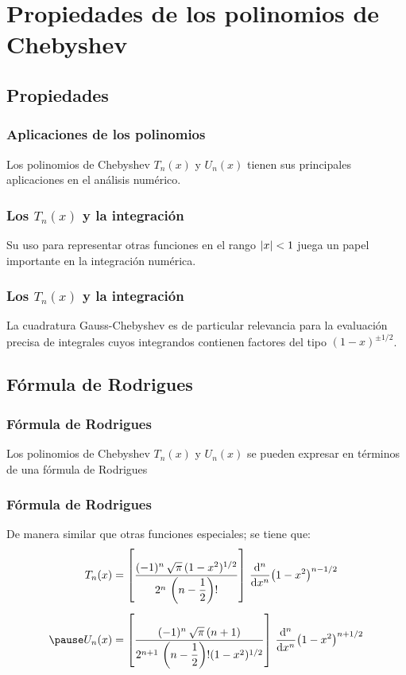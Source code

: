 \documentclass[12pt]{beamer}
\begin{document}
\section{Propiedades de los polinomios de Chebyshev}
\subsection{Propiedades}

\begin{frame}
\frametitle{Aplicaciones de los polinomios}
Los polinomios de Chebyshev $T_{n} (x)$ y $U_{n} (x)$ tienen sus principales aplicaciones en el análisis numérico.
\end{frame}
\begin{frame}
\frametitle{Los $T_{n} (x)$ y la integración}
Su uso para representar otras funciones en el rango $\abs{x} < 1$ juega un papel importante en la integración numérica.
\end{frame}
\begin{frame}
\frametitle{Los $T_{n} (x)$ y la integración}
La cuadratura Gauss-Chebyshev es de particular relevancia para la evaluación precisa de integrales cuyos integrandos contienen factores del tipo $(1 - x)^{\pm 1/2}$.
\end{frame}

\subsection{Fórmula de Rodrigues}

\begin{frame}
\frametitle{Fórmula de Rodrigues}
Los polinomios de Chebyshev $T_{n}(x)$ y $U_{n}(x)$ se pueden expresar en términos de una fórmula de Rodrigues
\end{frame}
\begin{frame}
\frametitle{Fórmula de Rodrigues}
De manera similar que otras funciones especiales; se tiene que:
\pause
\begin{eqnarray*}
\begin{aligned}
T_{n}(x) &= \left[ \dfrac{(-1)^{n} \, \sqrt{\pi} \, (1 - x^{2})^{1/2}}{2^{n} \, \left( n - \dfrac{1}{2} \right)!} \right] \, \dv[n]{x} (1 - x^{2})^{n-1/2} \\[0.5em] \pause
U_{n}(x) &= \left[ \dfrac{(-1)^{n} \, \sqrt{\pi} \, (n+1)}{2^{n+1} \, \left( n - \dfrac{1}{2} \right)! (1 - x^{2})^{1/2}} \right] \, \dv[n]{x} (1 - x^{2})^{n+1/2}
\end{aligned}
\end{eqnarray*}
\end{frame}
\end{document}
